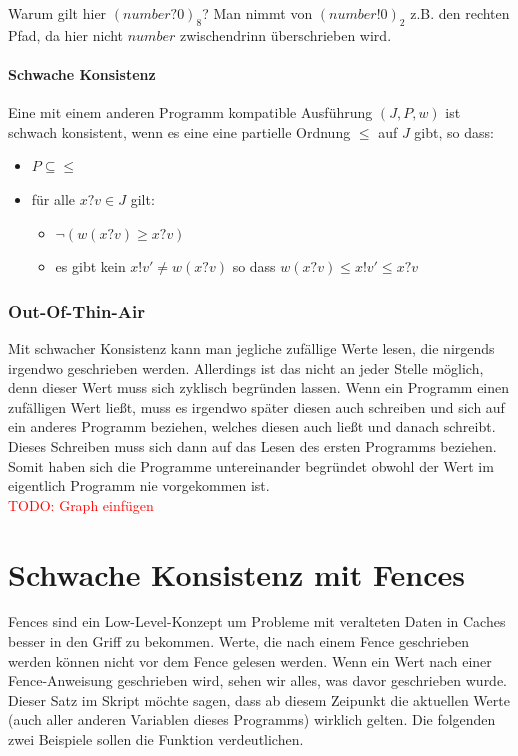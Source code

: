 \documentclass[a4paper,10pt, oneside]{book}
\begin{document}
Warum gilt hier $(number?0)_8$? Man nimmt von $(number!0)_2$ z.B. den rechten Pfad, da hier nicht $number$ zwischendrinn überschrieben wird.

\paragraph{Schwache Konsistenz}
Eine mit einem anderen Programm kompatible Ausführung $(J,P,w)$ ist schwach konsistent, wenn es eine 
eine partielle Ordnung $\leq$ auf $J$ gibt, so dass:
\begin{itemize}
	\item $P \subseteq \leq$
	\item für alle $x?v \in J$ gilt:
	\begin{itemize}
		\item $\neg(w(x?v) \geq x?v)$
		\item es gibt kein $x!v' \not= w(x?v)$ so dass $w(x?v) \leq x!v' \leq x?v$
	\end{itemize}
\end{itemize}

\subsubsection*{Out-Of-Thin-Air}
Mit schwacher Konsistenz kann man jegliche zufällige Werte lesen, die nirgends irgendwo geschrieben werden. Allerdings ist das nicht an jeder Stelle möglich, denn dieser Wert muss sich zyklisch begründen lassen. Wenn ein Programm einen zufälligen Wert ließt, muss es irgendwo später diesen auch schreiben und sich auf ein anderes Programm beziehen, welches diesen auch ließt und danach schreibt. Dieses Schreiben muss sich dann auf das Lesen des ersten Programms beziehen. Somit haben sich die Programme untereinander begründet obwohl der Wert im eigentlich Programm nie vorgekommen ist.\\

\textcolor{red}{TODO: Graph einfügen}\\

\section{Schwache Konsistenz mit Fences}
Fences sind ein Low-Level-Konzept um Probleme mit veralteten Daten in Caches besser in den Griff zu bekommen. Werte, die nach einem Fence geschrieben werden können nicht vor dem Fence gelesen werden. Wenn ein Wert nach einer Fence-Anweisung geschrieben wird, sehen wir alles, was davor geschrieben wurde. Dieser Satz im Skript möchte sagen, dass ab diesem Zeipunkt die aktuellen Werte (auch aller anderen Variablen dieses Programms) wirklich gelten. Die folgenden zwei Beispiele sollen die Funktion verdeutlichen.\\
\end{document}
